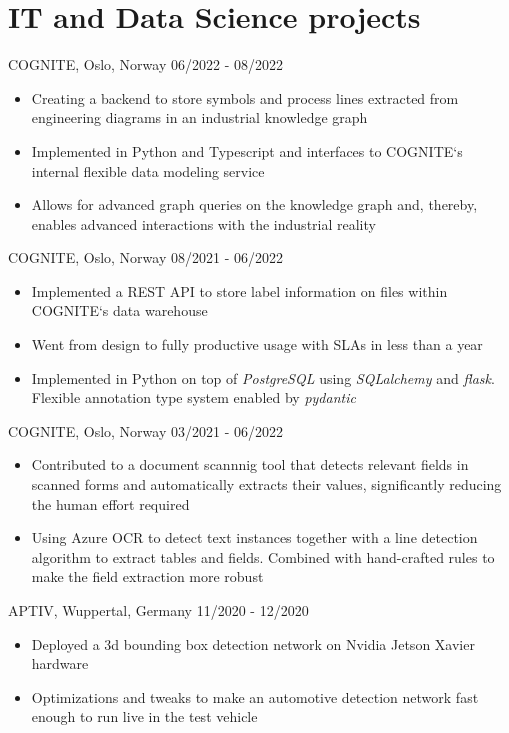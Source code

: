 \documentclass[singlesided,
               paper=a4,
               fontsize=10pt
              ]{my-resume}
\begin{document}
\section[\faGears]{IT and Data Science projects}
	{COGNITE, Oslo, Norway}
	{06/2022 - 08/2022}
	{\begin{itemize}
		\item Creating a backend to store symbols and process lines extracted from engineering diagrams in an industrial knowledge graph
		\item Implemented in Python and Typescript and interfaces to COGNITE`s internal flexible data modeling service
		\item Allows for advanced graph queries on the knowledge graph and, thereby, enables advanced interactions with the industrial reality
	\end{itemize}}
%
	{COGNITE, Oslo, Norway}
	{08/2021 - 06/2022}
	{\begin{itemize}
		\item Implemented a REST API to store label information on files within COGNITE`s data warehouse
		\item Went from design to fully productive usage with SLAs in less than a year
		\item Implemented in Python on top of \textit{PostgreSQL} using \textit{SQLalchemy} and \textit{flask}. Flexible annotation type system enabled by \textit{pydantic}
	\end{itemize}}
%
	{COGNITE, Oslo, Norway}
	{03/2021 - 06/2022}
	{\begin{itemize}
		\item Contributed to a document scannnig tool that detects relevant fields in scanned forms and automatically extracts their values, significantly reducing the human effort required
		\item Using Azure OCR to detect text instances together with a line detection algorithm to extract tables and fields. Combined with hand-crafted rules to make the field extraction more robust
	\end{itemize}}	
%
    {APTIV, Wuppertal, Germany}
    {11/2020 - 12/2020}
    {\begin{itemize}[leftmargin=2em]
        \item Deployed a 3d bounding box detection network on Nvidia Jetson Xavier hardware 
        \item Optimizations and tweaks to make an automotive detection network fast enough to run live in the test vehicle
    \end{itemize}}
\end{document}
